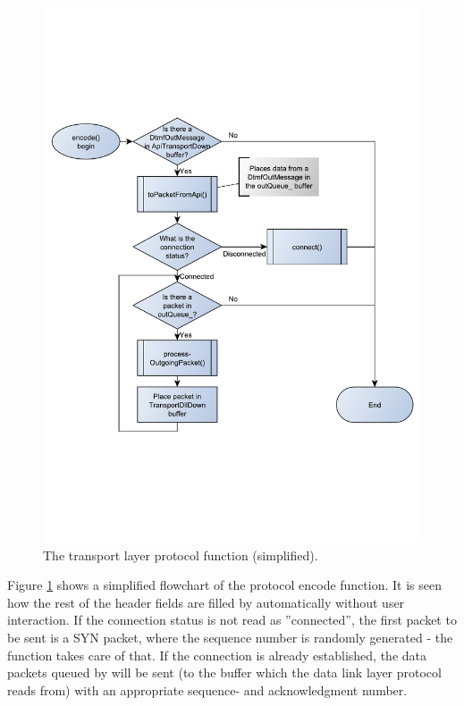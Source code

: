 \begin{figure}[htb]
 \centering
 \includegraphics[scale=0.66,trim=0 170 0 170]{content/graphics/transport/trans_encode_flowchart_simple.pdf}%
 \caption{The transport layer protocol  function (simplified).}
 \label{fig:trans_encode_flowchart_simple}
\end{figure}

Figure \ref{fig:trans_encode_flowchart_simple} shows a simplified flowchart of the protocol encode function. It is seen how the rest of the header fields are filled by  automatically without user interaction. If the connection status is not read as ''connected'', the first packet to be sent is a SYN packet, where the sequence number is randomly generated - the  function takes care of that. If the connection is already established, the data packets queued by  will be sent (to the  buffer which the data link layer protocol reads from) with an appropriate sequence- and acknowledgment number.

